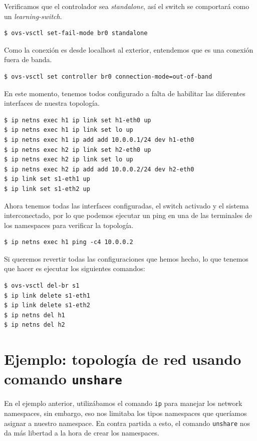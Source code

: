 \documentclass[a4paper, oneside, 12pt]{book}
\begin{document}
	\noindent Verificamos que el controlador sea \textit{standalone}, así el switch se comportará como un \textit{learning-switch}.
	\begin{verbatim}
$ ovs-vsctl set-fail-mode br0 standalone
	\end{verbatim}

	\noindent Como la conexión es desde localhost al exterior, entendemos que es una conexión fuera de banda.
	\begin{verbatim}
$ ovs-vsctl set controller br0 connection-mode=out-of-band
	\end{verbatim}

	\noindent En este momento, tenemos todos configurado a falta de habilitar las diferentes interfaces de nuestra topología.
	\begin{verbatim}
$ ip netns exec h1 ip link set h1-eth0 up
$ ip netns exec h1 ip link set lo up
$ ip netns exec h1 ip add add 10.0.0.1/24 dev h1-eth0
$ ip netns exec h2 ip link set h2-eth0 up
$ ip netns exec h2 ip link set lo up
$ ip netns exec h2 ip add add 10.0.0.2/24 dev h2-eth0
$ ip link set s1-eth1 up
$ ip link set s1-eth2 up
	\end{verbatim}

	\noindent Ahora tenemos todas las interfaces configuradas, el switch activado y el sistema interconectado, por lo que podemos ejecutar un ping en una de las terminales de los namespaces para verificar la topología.
	\begin{verbatim}
$ ip netns exec h1 ping -c4 10.0.0.2
	\end{verbatim}

	\noindent Si queremos revertir todas las configuraciones que hemos hecho, lo que tenemos que hacer es ejecutar los siguientes comandos:
	\begin{verbatim}
$ ovs-vsctl del-br s1
$ ip link delete s1-eth1
$ ip link delete s1-eth2
$ ip netns del h1
$ ip netns del h2
	\end{verbatim}

	\pagebreak

	\section[Ejemplo: topología de red con \texttt{unshare}]{Ejemplo: topología de red usando comando \texttt{unshare}}
	\noindent En el ejemplo anterior, utilizábamos el comando \texttt{ip} para manejar los network namespaces, sin embargo, eso nos limitaba los tipos namespaces que queríamos asignar a nuestro namespace. En contra partida a esto, el comando \texttt{unshare} nos da más libertad a la hora de crear los namespaces. \\
	
\end{document}
